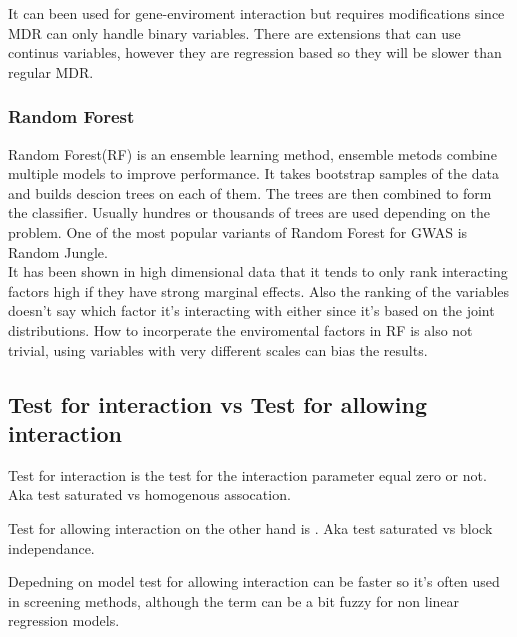 \documentclass[10pt,a4paper]{article}
\begin{document}
It can been used for gene-enviroment interaction but requires modifications since MDR can only handle binary variables. There are extensions that can use continus variables, however they are regression based so they will be slower than regular MDR.\cite{gene_enviroment_2013}

\subsubsection{Random Forest}
Random Forest(RF) is an ensemble learning method, ensemble metods combine multiple models to improve performance. It takes bootstrap samples of the data and builds descion trees on each of them. The trees are then combined to form the classifier. Usually hundres or thousands of trees are used depending on the problem\cite{random_forest}. One of the most popular variants of Random Forest for GWAS is Random Jungle.\cite{random_jungle}
\\
It has been shown in high dimensional data that it tends to only rank interacting factors high if they have strong marginal effects\cite{winham_rf_2012}. Also the ranking of the variables doesn't say which factor it's interacting with either since it's based on the joint distributions\cite{gene_enviroment_2013}. How to incorperate the enviromental factors in RF is also not trivial, using variables with very different scales can bias the results\cite{gene_enviroment_2013}.


\subsection{Test for interaction vs Test for allowing interaction}
\label{test_type}
Test for interaction is the test for the interaction parameter equal zero or not. Aka test saturated vs homogenous assocation\cite{boost_gene_gene}.

Test for allowing interaction on the other hand is . Aka test saturated vs block independance\cite{boost_gene_gene}.

Depedning on model test for allowing interaction can be faster so it's often used in screening methods, although the term can be a bit fuzzy for non linear regression models. \cite{cordell_detect_review}
\end{document}
